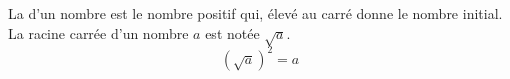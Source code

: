 La  d'un nombre est le nombre positif qui, élevé au carré
donne le nombre initial. La racine carrée d'un nombre $a$ est notée $\sqrt{a}$.
$$(\sqrt{a})^2=a$$